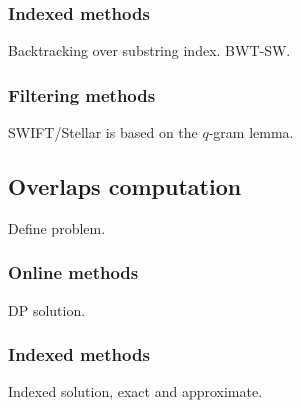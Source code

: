 \subsubsection{Indexed methods}
Backtracking over substring index. BWT-SW.

\subsubsection{Filtering methods}
SWIFT/Stellar is based on the $q$-gram lemma.



\subsection{Overlaps computation}

Define problem.

\subsubsection{Online methods}

DP solution.

\subsubsection{Indexed methods}

Indexed solution, exact and approximate.

